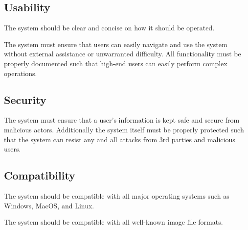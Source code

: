 \documentclass[11pt,a4paper]{article}
\begin{document}
\subsection*{Usability} 
The system should be clear and concise on how it should be operated. 

The system must ensure that users can easily navigate and use the system without external assistance or unwarranted difficulty. All functionality must be properly documented such that high-end users can easily perform complex operations.

\subsection*{Security} 

The system must ensure that a user's information is kept safe and secure from malicious actors. Additionally the system itself must be properly protected such that the system can resist any and all attacks from 3rd parties and malicious users. 

\subsection*{Compatibility} 

The system should be compatible with all major operating systems such as
Windows, MacOS, and Linux.

The system should be compatible with all well-known image file formats.
\end{document}
